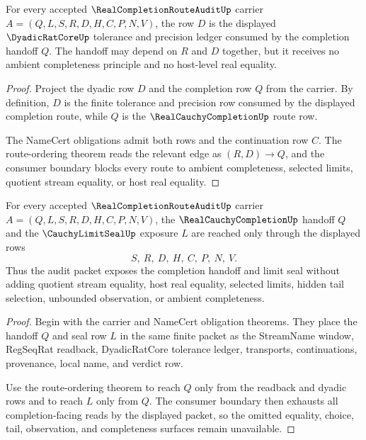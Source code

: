\begin{theorem}
\label{thm:realcompletionrouteaudit-dyadic-tolerance-exposure}
For every accepted $\RealCompletionRouteAuditUp$ carrier $A=(Q,L,S,R,D,H,C,P,N,V)$, the row $D$ is the displayed $\DyadicRatCoreUp$ tolerance and precision ledger consumed by the completion handoff $Q$. The handoff may depend on $R$ and $D$ together, but it receives no ambient completeness principle and no host-level real equality.
\end{theorem}
\begin{proof}
Project the dyadic row $D$ and the completion row $Q$ from the carrier. By definition, $D$ is the finite tolerance and precision row consumed by the displayed completion route, while $Q$ is the $\RealCauchyCompletionUp$ route row.

The NameCert obligations admit both rows and the continuation row $C$. The route-ordering theorem reads the relevant edge as $(R,D)\to Q$, and the consumer boundary blocks every route to ambient completeness, selected limits, quotient stream equality, or host real equality.
\end{proof}

\begin{theorem}
\label{thm:realcompletionrouteaudit-seal-handoff}
For every accepted $\RealCompletionRouteAuditUp$ carrier $A=(Q,L,S,R,D,H,C,P,N,V)$, the $\RealCauchyCompletionUp$ handoff $Q$ and the $\CauchyLimitSealUp$ exposure $L$ are reached only through the displayed rows
$$
S,\ R,\ D,\ H,\ C,\ P,\ N,\ V.
$$
Thus the audit packet exposes the completion handoff and limit seal without adding quotient stream equality, host real equality, selected limits, hidden tail selection, unbounded observation, or ambient completeness.
\end{theorem}
\begin{proof}
Begin with the carrier and NameCert obligation theorems. They place the handoff $Q$ and seal row $L$ in the same finite packet as the StreamName window, RegSeqRat readback, DyadicRatCore tolerance ledger, transports, continuations, provenance, local name, and verdict row.

Use the route-ordering theorem to reach $Q$ only from the readback and dyadic rows and to reach $L$ only from $Q$. The consumer boundary then exhausts all completion-facing reads by the displayed packet, so the omitted equality, choice, tail, observation, and completeness surfaces remain unavailable.
\end{proof}

